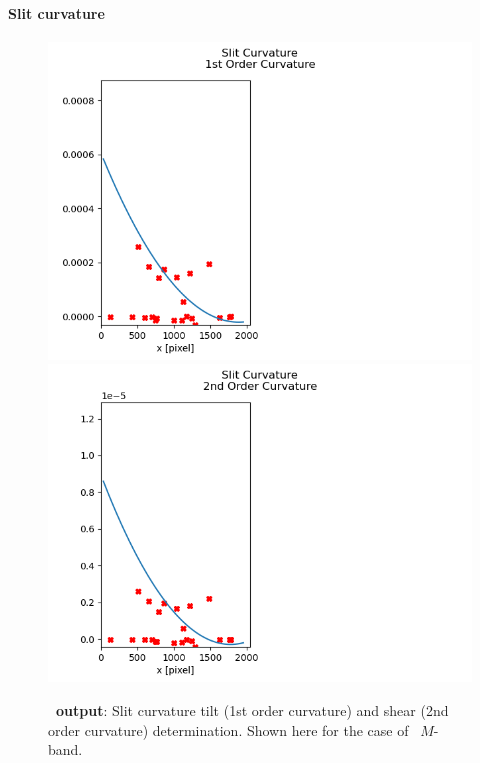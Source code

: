 \paragraph{Slit curvature}\label{sec:critalg_orderrect}

\begin{figure}
\centering
  \includegraphics[width=\linewidth]{figures/LSS_CrtAlg_files/Figure_8.png}
  \includegraphics[width=\linewidth]{figures/LSS_CrtAlg_files/Figure_9.png}
  \caption{\textbf{\pyred~output}: Slit curvature tilt (1st order curvature) and shear (2nd order curvature) determination. Shown here for the case of \lss~$M$-band. } 
  \label{fig:fig6n7}
\end{figure}

